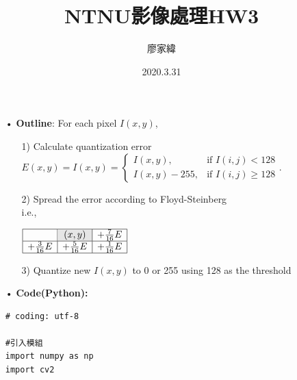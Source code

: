 \documentclass[12pt,a4paper]{article}
\title{NTNU影像處理HW3}
\author{廖家緯}
\date{2020.3.31}
\begin{document}
\maketitle
\fontsize{12pt}{20pt}\selectfont
\setlength{\baselineskip}{20pt}

\pagestyle{fancy}
\lhead{}
\chead{}
\rhead{}
\lfoot{}
\cfoot{\thepage}
\rfoot{}
\renewcommand{\headrulewidth}{0pt} %
\renewcommand{\footrulewidth}{0pt} %




\begin{enumerate}
\item[•]{\bf Outline}:
For each pixel $I(x,y)$,
\begin{enumerate}
\item[1)]Calculate quantization error
\vspace*{1em}\\
$E(x,y)=
I(x,y) = \begin{cases}
I(x,y), & \text{if } I(i,j)<128\\
I(x,y)-255, & \text{if } I(i,j)\geq 128
\end{cases}$.
\vspace*{1em}\\

\item[2)]
Spread the error according to Floyd-Steinberg\\
i.e.,
\begin{center}
$\begin{array}{|c|c|c|}
\hline
 & \cellcolor{gray!20}(x,y) & +\frac{7}{16}E\\
\hline
+\frac{3}{16}E & +\frac{5}{16}E & +\frac{1}{16}E\\
\hline
\end{array}$
\vspace*{2em}\\
\end{center}

\item[3)]
Quantize new $I(x,y)$ to 0 or 255 using 128 as the threshold
\vspace*{2em}\\
\end{enumerate}


\item[•]
{\bf Code(Python):}
\begin{lstlisting}
# coding: utf-8

#引入模組
import numpy as np
import cv2


\end{lstlisting}
\end{enumerate}
\end{document}
